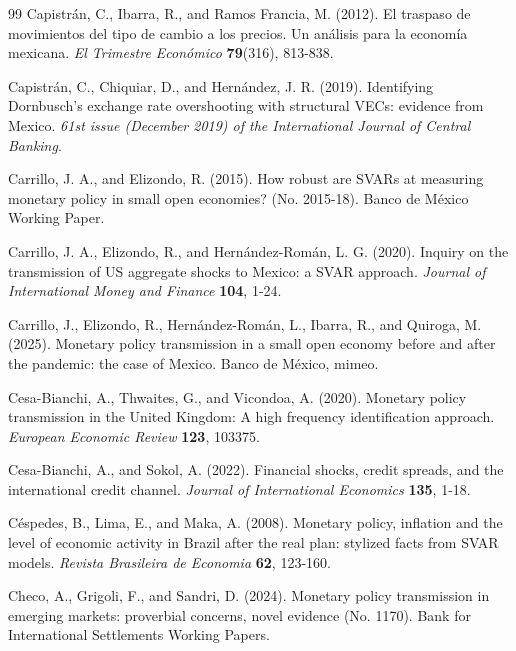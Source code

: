 \documentclass[12pt, reqno]{article}
\begin{document}
\begin{thebibliography}{99}
\bibitem{} \hypertarget{Capistrán et al. (2012)}{}Capistrán, C., Ibarra, R., and Ramos Francia, M. (2012). El traspaso de movimientos del tipo de cambio a los precios. Un análisis para la economía mexicana. \textit{El Trimestre Económico} \textbf{79}(316), 813-838.

\bibitem{} \hypertarget{Capistran at al. (2019)}{}Capistrán, C., Chiquiar, D., and Hernández, J. R. (2019). Identifying Dornbusch's exchange rate overshooting with structural VECs: evidence from Mexico. \textit{61st issue (December 2019) of the International Journal of Central Banking}.

\bibitem{} \hypertarget{Carrillo and Elizondo (2015)}{}Carrillo, J. A., and Elizondo, R. (2015). How robust are SVARs at measuring monetary policy in small open economies? (No. 2015-18). Banco de México Working Paper.

\bibitem{} \hypertarget{Carrillo et al. (2020)}{} Carrillo, J. A., Elizondo, R., and Hernández-Román, L. G. (2020). Inquiry on the transmission of US aggregate shocks to Mexico: a SVAR approach. \textit{Journal of International Money and Finance} \textbf{104}, 1-24.

\bibitem{} \hypertarget{Carrillo et al. (2025)}{}Carrillo, J., Elizondo, R., Hernández-Román, L., Ibarra, R., and Quiroga, M. (2025). Monetary policy transmission in a small open economy
before and after the pandemic: the case of Mexico. Banco de México, mimeo.

\bibitem{} \hypertarget{Cesa-Bianchi et al. (2020)}{}
Cesa-Bianchi, A., Thwaites, G., and Vicondoa, A. (2020). Monetary policy transmission in the United Kingdom: A high frequency identification approach. \textit{European Economic Review} \textbf{123}, 103375.

\bibitem{} \hypertarget{Cesa (2022)}{} Cesa-Bianchi, A., and Sokol, A. (2022). Financial shocks, credit spreads, and the international credit channel. \textit{Journal of International Economics} \textbf{135}, 1-18.

\bibitem{} \hypertarget{Cespedes et al. (2008)}{} 
Céspedes, B., Lima, E., and Maka, A. (2008). Monetary policy, inflation and the level of economic activity in Brazil after the real plan: stylized facts from SVAR models. \textit{Revista Brasileira de Economia} \textbf{62}, 123-160.

\bibitem{} \hypertarget{Checo et al. (2024)}{}Checo, A., Grigoli, F., and Sandri, D. (2024). Monetary policy transmission in emerging markets: proverbial concerns, novel evidence (No. 1170). Bank for International Settlements Working Papers.


\end{thebibliography}
\end{document}
